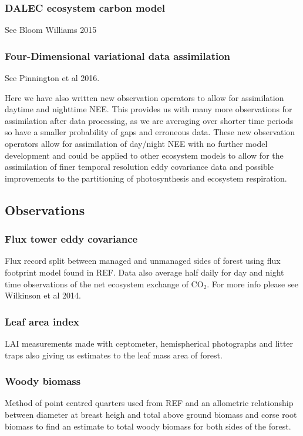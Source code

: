 \documentclass[11pt]{article}
\begin{document}
\subsubsection{DALEC ecosystem carbon model}
See Bloom Williams 2015
\subsubsection{Four-Dimensional variational data assimilation}
See Pinnington et al 2016.

Here we have also written new observation operators to allow for assimilation daytime and nighttime NEE. This provides us with many more observations for assimilation after data processing, as we are averaging over shorter time periods so have a smaller probability of gaps and erroneous data. These new observation operators allow for assimilation of day/night NEE with no further model development and could be applied to other ecosystem models to allow for the assimilation of finer temporal resolution eddy covariance data and possible improvements to the partitioning of photosynthesis and ecosystem respiration. 

\subsection{Observations}
\subsubsection{Flux tower eddy covariance}
Flux record split between managed and unmanaged sides of forest using flux footprint model found in REF. Data also average half daily for day and night time observations of the net ecosystem exchange of CO\(_{2}\). For more info please see Wilkinson et al 2014.
\subsubsection{Leaf area index}
LAI measurements made with ceptometer, hemispherical photographs and litter traps also giving us estimates to the leaf mass area of forest.
\subsubsection{Woody biomass}  
Method of point centred quarters used from REF and an allometric relationship between diameter at breast heigh and total above ground biomass and corse root biomass to find an estimate to total woody biomass for both sides of the forest.
\end{document}
